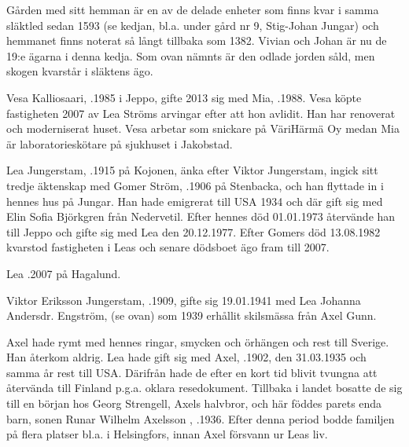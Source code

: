 Gården med sitt hemman är en av de delade enheter som finns kvar i samma släktled sedan 1593 (se kedjan, bl.a. under gård nr 9, Stig-Johan Jungar) och hemmanet finns noterat så långt tillbaka som 1382. Vivian och Johan är nu de 19:e ägarna i denna kedja. Som ovan nämnts är den odlade jorden såld, men skogen kvarstår i släktens ägo.





Vesa Kalliosaari, .1985 i Jeppo, gifte 2013 sig med Mia, .1988. Vesa köpte fastigheten 2007 av Lea Ströms arvingar efter att hon avlidit. Han har renoverat och moderniserat huset. Vesa arbetar som snickare på VäriHärmä Oy medan Mia är laboratorieskötare  på sjukhuset i Jakobstad.
\begin{jhchildren}
  \item {}
  \item {}
\end{jhchildren}


Lea Jungerstam, .1915 på Kojonen, änka efter Viktor Jungerstam, ingick sitt tredje äktenskap med Gomer Ström, .1906 på Stenbacka, och han flyttade in i hennes hus på Jungar. Han hade emigrerat till USA 1934 och där gift sig med Elin Sofia Björkgren från Nedervetil. Efter hennes död 01.01.1973 återvände han till Jeppo och gifte sig med Lea den 20.12.1977. Efter Gomers död 13.08.1982 kvarstod fastigheten i Leas och senare dödsboet ägo fram till 2007.

Lea .2007 på Hagalund.


Viktor Eriksson Jungerstam, .1909, gifte sig 19.01.1941 med Lea Johanna Andersdr. Engström,  (se ovan) som 1939 erhållit skilsmässa från Axel Gunn.

Axel hade rymt med hennes ringar, smycken och örhängen och rest till Sverige. Han återkom aldrig. Lea hade gift sig med Axel, .1902, den 31.03.1935 och samma år rest till USA. Därifrån hade de efter en kort tid blivit tvungna att återvända till Finland p.g.a. oklara resedokument. Tillbaka i landet bosatte de sig till en början hos Georg Strengell, Axels halvbror, och här föddes parets enda barn, sonen Runar Wilhelm Axelsson , .1936. Efter denna period bodde familjen på flera platser bl.a. i Helsingfors, innan Axel försvann ur Leas liv.

